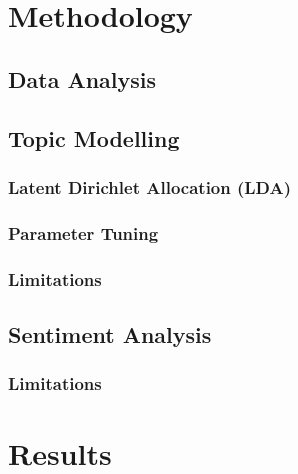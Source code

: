\documentclass[12pt,english,titlepage,a4paper]{article}
\begin{document}

\tableofcontents
\pagebreak





\section{Methodology}




\subsection{Data Analysis}

\subsection{Topic Modelling}
\subsubsection{Latent Dirichlet Allocation (LDA)}
\subsubsection{Parameter Tuning}
\subsubsection{Limitations}
\subsection{Sentiment Analysis}
\subsubsection{Limitations}

\section{Results}
\end{document}
